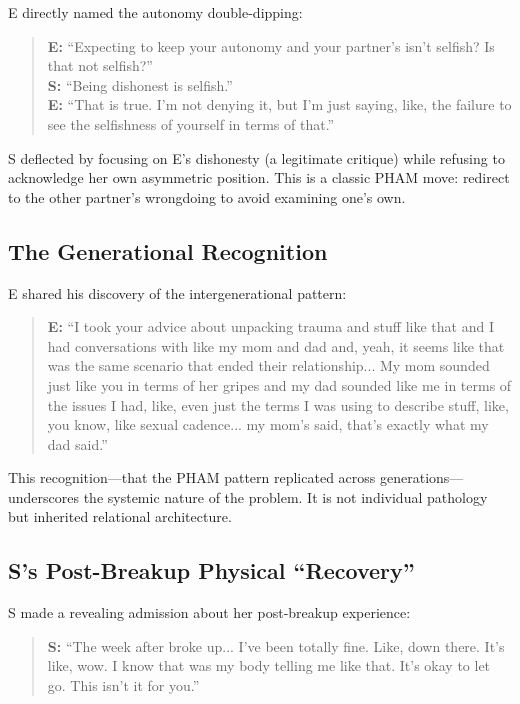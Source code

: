 \documentclass[12pt,openany]{book}
\numberwithin{equation}{chapter}
\begin{document}
E directly named the autonomy double-dipping:

\begin{quote}
\textbf{E:} ``Expecting to keep your autonomy and your partner's isn't selfish? Is that not selfish?''\\[0.5em]
\textbf{S:} ``Being dishonest is selfish.''\\[0.5em]
\textbf{E:} ``That is true. I'm not denying it, but I'm just saying, like, the failure to see the selfishness of yourself in terms of that.''
\end{quote}

S deflected by focusing on E's dishonesty (a legitimate critique) while refusing to acknowledge her own asymmetric position. This is a classic PHAM move: redirect to the other partner's wrongdoing to avoid examining one's own.

\subsection{The Generational Recognition}

E shared his discovery of the intergenerational pattern:

\begin{quote}
\textbf{E:} ``I took your advice about unpacking trauma and stuff like that and I had conversations with like my mom and dad and, yeah, it seems like that was the same scenario that ended their relationship... My mom sounded just like you in terms of her gripes and my dad sounded like me in terms of the issues I had, like, even just the terms I was using to describe stuff, like, you know, like sexual cadence... my mom's said, that's exactly what my dad said.''
\end{quote}

This recognition---that the PHAM pattern replicated across generations---underscores the systemic nature of the problem. It is not individual pathology but inherited relational architecture.

\subsection{S's Post-Breakup Physical ``Recovery''}

S made a revealing admission about her post-breakup experience:

\begin{quote}
\textbf{S:} ``The week after broke up... I've been totally fine. Like, down there. It's like, wow. I know that was my body telling me like that. It's okay to let go. This isn't it for you.''
\end{quote}
\end{document}
